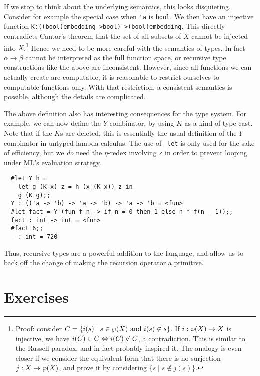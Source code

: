 If we stop to think about the underlying semantics, this looks disquieting.
Consider for example the special case when {\verb+'a+} is {\verb+bool+}. We
then have an injective function
{\verb+K:((bool)embedding->bool)->(bool)embedding+}. This directly contradicts
Cantor's theorem that the set of all subsets of $X$ cannot be injected into
$X$.\footnote{Proof: consider $C = \{ i(s) \mid s \in \wp(X) \mbox{ and }
i(s) \not\in s \}$. If $i:\wp(X) \to X$ is injective, we have $i(C) \in C
\Leftrightarrow i(C) \not\in C$, a contradiction. This is similar to the Russell paradox,
and in fact probably inspired it. The analogy is even closer if we consider the
equivalent form that there is no surjection $j:X \to \wp(X)$, and prove
it by considering $\{s \mid s \not\in j(s)\}$.} Hence we need to be more
careful with the semantics of types. In fact $\alpha \to \beta$ cannot be
interpreted as the full function space, or recursive type constructions like
the above are inconsistent. However, since all functions we can actually create
are computable, it is reasonable to restrict ourselves to computable functions
only. With that restriction, a consistent semantics is possible, although the
details are complicated.

The above definition also has interesting consequences for the type system. For
example, we can now define the $Y$ combinator, by using $K$ as a kind of type
cast. Note that if the $K$s are deleted, this is essentially the usual
definition of the $Y$ combinator in untyped lambda calculus. The use of {\tt
let} is only used for the sake of efficiency, but we {\em do} need the
$\eta$-redex involving {\tt z} in order to prevent looping under ML's
evaluation strategy.

\begin{boxed}\begin{verbatim}
  #let Y h =
    let g (K x) z = h (x (K x)) z in
    g (K g);;
  Y : (('a -> 'b) -> 'a -> 'b) -> 'a -> 'b = <fun>
  #let fact = Y (fun f n -> if n = 0 then 1 else n * f(n - 1));;
  fact : int -> int = <fun>
  #fact 6;;
  - : int = 720
\end{verbatim}\end{boxed}

Thus, recursive types are a powerful addition to the language, and allow us to
back off the change of making the recursion operator a primitive.

\section*{Exercises}

